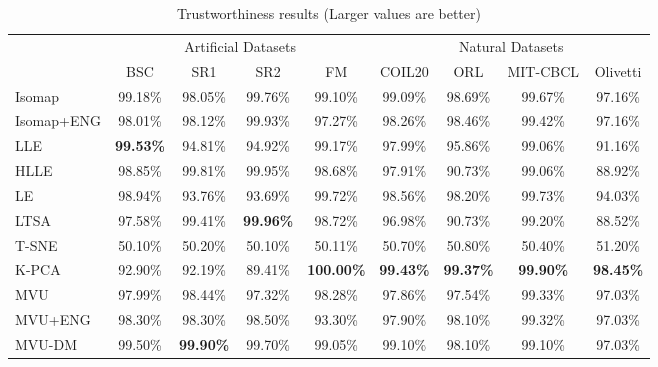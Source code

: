 \begin{table}[t]
\caption{Trustworthiness results (Larger values are better)}
\label{tab:trustworthiness}
\begin{center}
\begin{tabular}{|l|c|c|c|c||c|c|c|c|}
\hline
\multicolumn{1}{|c|}{} & \multicolumn{4}{c||}{Artificial Datasets} & \multicolumn{4}{c|}{Natural Datasets} \\
                     & BSC & SR1 & SR2 & FM & COIL20 & ORL & MIT-CBCL & Olivetti \\
\hline
Isomap            & 99.18\% & 98.05\% & 99.76\% & 99.10\% & 99.09\% & 98.69\% & 99.67\% & 97.16\% \\
Isomap+ENG            & 98.01\% & 98.12\% & 99.93\% & 97.27\% & 98.26\% & 98.46\% & 99.42\% & 97.16\% \\
LLE            & \textbf{99.53\%} & 94.81\% & 94.92\% & 99.17\% & 97.99\% & 95.86\% & 99.06\% & 91.16\% \\
HLLE            & 98.85\% & 99.81\% & 99.95\% & 98.68\% & 97.91\% & 90.73\% & 99.06\% & 88.92\% \\
LE            & 98.94\% & 93.76\% & 93.69\% & 99.72\% & 98.56\% & 98.20\% & 99.73\% & 94.03\% \\
LTSA            & 97.58\% & 99.41\% & \textbf{99.96\%} & 98.72\% & 96.98\% & 90.73\% & 99.20\% & 88.52\% \\
T-SNE            & 50.10\% & 50.20\% & 50.10\% & 50.11\% & 50.70\% & 50.80\% & 50.40\% & 51.20\% \\
K-PCA            & 92.90\% & 92.19\% & 89.41\% & \textbf{100.00\%} & \textbf{99.43\%} & \textbf{99.37\%} & \textbf{99.90\%} & \textbf{98.45\%} \\
\hline
MVU            & 97.99\% & 98.44\% & 97.32\% & 98.28\% & 97.86\% & 97.54\% & 99.33\% & 97.03\% \\
MVU+ENG            & 98.30\% & 98.30\% & 98.50\% & 93.30\% & 97.90\% & 98.10\% & 99.32\% & 97.03\% \\
MVU-DM            & 99.50\% & \textbf{99.90\%} & 99.70\% & 99.05\% & 99.10\% & 98.10\% & 99.10\% & 97.03\% \\
\hline
\end{tabular}
\end{center}
\end{table}

